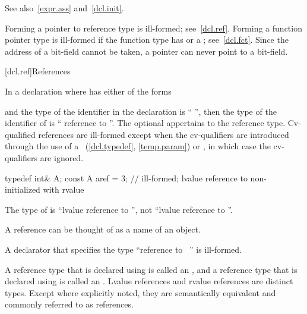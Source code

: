 \pnum
See also~\ref{expr.ass} and~\ref{dcl.init}.

\pnum
\begin{note}
Forming a pointer to reference type is ill-formed; see~\ref{dcl.ref}.
Forming a function pointer type is ill-formed if the function type has
 or a ;
see~\ref{dcl.fct}.
Since the address of a bit-field cannot be taken,
a pointer can never point to a bit-field.
\end{note}

[dcl.ref]{References}%

\pnum
In a declaration
where
has either of the forms
\begin{ncsimplebnf}
\terminal{\&}  \br
\terminal{\&\&}  
\end{ncsimplebnf}
and the type of the identifier in the declaration
is ``
'',
then the type of the identifier of
is `` reference to
''.
The optional  appertains to the reference type.
Cv-qualified references are ill-formed except when the cv-qualifiers
are introduced through the use of a
~(\ref{dcl.typedef}, \ref{temp.param}) or
,
in which case the cv-qualifiers are ignored.
\begin{example}
\begin{codeblock}
typedef int& A;
const A aref = 3;   // ill-formed; lvalue reference to non- initialized with rvalue
\end{codeblock}

The type of
is ``lvalue reference to '',
not ``lvalue reference to ''.
\end{example}
\begin{note}
A reference can be thought of as a name of an object.
\end{note}
%
A declarator that specifies the type
``reference to \cv{}~''
is ill-formed.


\pnum
A reference type that is declared using \tcode{\&} is called an
, and a reference type that
is declared using \tcode{\&\&} is called an
. Lvalue references and
rvalue references are distinct types. Except where explicitly noted, they are
semantically equivalent and commonly referred to as references.

